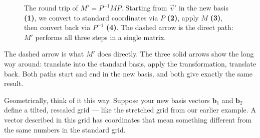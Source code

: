 \documentclass[11pt,openany]{book}
\theoremstyle{definition}
\begin{document}
\begin{figure}[H]
{%
}
\caption{The round trip of $M' = P^{-1}MP$. Starting from $\vec{v}'$ in the new basis
\textbf{(1)}, we convert to standard coordinates via $P$ \textbf{(2)}, apply $M$
\textbf{(3)}, then convert back via $P^{-1}$ \textbf{(4)}. The dashed arrow is the
direct path: $M'$ performs all three steps in a single matrix.}
\label{fig:change_of_basis_roundtrip}
\end{figure}

\medskip

The dashed arrow is what $M'$ does directly. The three solid arrows show the long way
around: translate into the standard basis, apply the transformation, translate back.
Both paths start and end in the new basis, and both give exactly the same result.


\medskip

Geometrically, think of it this way. Suppose your new basis vectors $\mathbf{b}_1$
and $\mathbf{b}_2$ define a tilted, rescaled grid --- like the stretched grid from
our earlier example. A vector described in this grid has coordinates that mean
something different from the same numbers in the standard grid.
\end{document}
